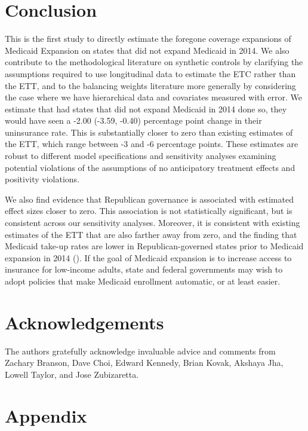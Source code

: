 \documentclass[12pt]{article}
\begin{document}
\section{Conclusion}

This is the first study to directly estimate the foregone coverage expansions of Medicaid Expansion on states that did not expand Medicaid in 2014. We also contribute to the methodological literature on synthetic controls by clarifying the assumptions required to use longitudinal data to estimate the ETC rather than the ETT, and to the balancing weights literature more generally by considering the case where we have hierarchical data and covariates measured with error. We estimate that had states that did not expand Medicaid in 2014 done so, they would have seen a -2.00 (-3.59, -0.40) percentage point change in their uninsurance rate. This is substantially closer to zero than existing estimates of the ETT, which range between -3 and -6 percentage points. These estimates are robust to different model specifications and sensitivity analyses examining potential violations of the assumptions of no anticipatory treatment effects and positivity violations.

We also find evidence that Republican governance is associated with estimated effect sizes closer to zero. This association is not statistically significant, but is consistent across our sensitivity analyses. Moreover, it is consistent with existing estimates of the ETT that are also farther away from zero, and the finding that Medicaid take-up rates are lower in Republican-governed states prior to Medicaid expansion in 2014 (\cite{sommers2012understanding}). If the goal of Medicaid expansion is to increase access to insurance for low-income adults, state and federal governments may wish to adopt policies that make Medicaid enrollment automatic, or at least easier.

\section{Acknowledgements}

The authors gratefully acknowledge invaluable advice and comments from Zachary Branson, Dave Choi, Edward Kennedy, Brian Kovak, Akshaya Jha, Lowell Taylor, and Jose Zubizaretta.

\cleardoublepage
 

\cleardoublepage

\section{Appendix}
\end{document}
